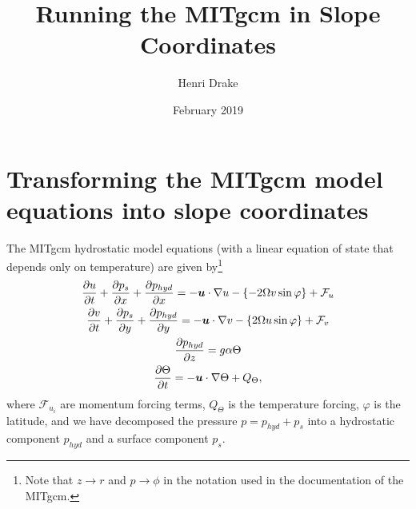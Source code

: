\documentclass{article}
\title{Running the MITgcm in Slope Coordinates}
\author{Henri Drake}
\date{February 2019}
\begin{document}
\maketitle

\section{Transforming the MITgcm model equations into slope coordinates}\label{appendix}

The MITgcm hydrostatic model equations (with a linear equation of state that depends only on temperature) are given by\footnote{Note that $z \rightarrow r$ and $p \rightarrow \phi$ in the notation used in the documentation of the MITgcm.}
\begin{gather}
    \pdv{u}{t} + \pdv{p_{s}}{x} + \pdv{p_{hyd}}{x} = - \bm{u} \cdot \nabla u -\left\{ -2\Omega v \sin{\varphi} \right\} + \mathcal{F}_{u}
    \\
    \pdv{v}{t} + \pdv{p_{s}}{y} + \pdv{p_{hyd}}{y} = - \bm{u} \cdot \nabla v -\left\{ 2\Omega u \sin{\varphi} \right\} + \mathcal{F}_{v}
    \\
    \pdv{p_{hyd}}{z} = g\alpha \Theta
    \\
    \pdv{\Theta}{t} = - \bm{u} \cdot \nabla \Theta + Q_{\Theta},
\end{gather}
where $\mathcal{F}_{u_{i}}$ are momentum forcing terms, $Q_{\Theta}$ is the temperature forcing, $\varphi$ is the latitude, and we have decomposed the pressure $p = p_{hyd} + p_{s}$ into a hydrostatic component $p_{hyd}$ and a surface component $p_{s}$.
\end{document}
